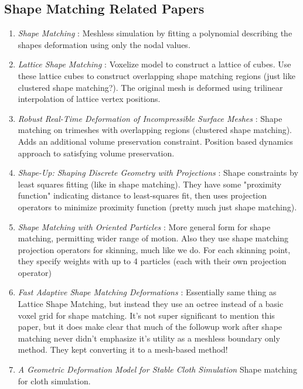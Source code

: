 \documentclass[sigconf]{acmart}
\begin{document}
\subsection{Shape Matching Related Papers}
\begin{enumerate}
    \item \textit{Shape Matching} \cite{10.1145/1073204.1073216}: Meshless simulation by fitting a polynomial describing the shapes deformation using only the nodal values.
    \item \textit{Lattice Shape Matching} \cite{10.1145/1275808.1276480}: Voxelize model to construct a lattice of cubes. Use these lattice cubes to construct overlapping shape matching regions (just like clustered shape matching?). The original mesh is deformed using trilinear interpolation of lattice vertex positions.
    \item \textit{Robust Real-Time Deformation of Incompressible Surface Meshes} \cite{10.1145/2019406.2019438}: Shape matching on trimeshes with overlapping regions (clustered shape matching). Adds an additional volume preservation constraint. Position based dynamics approach to satisfying volume preservation.
    \item \textit{Shape-Up: Shaping Discrete Geometry with Projections} \cite{10.1111/j.1467-8659.2012.03171.x}: Shape constraints by least squares fitting (like in shape matching). They have some "proximity function" indicating distance to least-squares fit, then uses projection operators to minimize proximity function (pretty much just shape matching). 
    \item \textit{Shape Matching with Oriented Particles} \cite{10.1145/1964921.1964987}: More general form for shape matching, permitting wider range of motion. Also they use shape matching projection operators for skinning, much like we do. For each skinning point, they specify weights with up to 4 particles (each with their own projection operator)
    \item \textit{Fast Adaptive Shape Matching Deformations} \cite{10.5555/1632592.1632606}: Essentially same thing as Lattice Shape Matching, but instead they use an octree instead of a basic voxel grid for shape matching. It's not super significant to mention this paper, but it does make clear that much of the followup work after shape matching never didn't emphasize it's utility as a meshless boundary only method. They kept converting it to a mesh-based method!
    \item \textit{A Geometric Deformation Model for Stable Cloth Simulation} \cite{10.2312/PE/vriphys/vriphys08/039-046} Shape matching for cloth simulation.
\end{enumerate}
\end{document}
